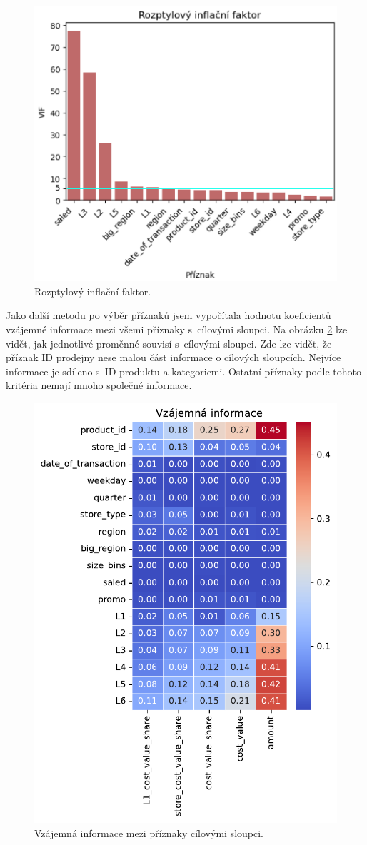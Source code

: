 \begin{figure}[h!]
      \centering
      \includegraphics[width=.6\textwidth]{obrazky/zntb/VIF2.png} %
      \caption{Rozptylový inflační faktor.}
      \label{obr:nb:vif}

    \end{figure}

Jako další metodu po výběr příznaků jsem vypočítala hodnotu koeficientů vzájemné informace mezi všemi příznaky s~cílovými sloupci. Na obrázku \ref*{obr:nb:MI_FS} lze vidět, jak jednotlivé proměnné souvisí s~cílovými sloupci. 
Zde lze vidět, že příznak ID prodejny nese malou část informace o cílových sloupcích. Nejvíce informace je sdíleno s~ID produktu a kategoriemi. Ostatní příznaky podle tohoto kritéria nemají mnoho společné informace.

\begin{figure}[h!]
    \centering
    \includegraphics[width=.5\textwidth]{obrazky/pripravadat/matrix_MI-everything-SFF-stores-002.pdf}
    \caption{Vzájemná informace mezi příznaky cílovými sloupci.}
    \label{obr:nb:MI_FS}

  \end{figure}

